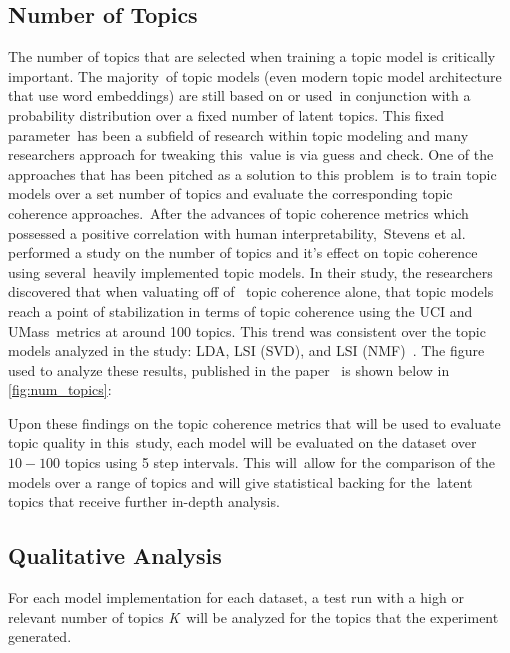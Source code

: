 \documentclass[letterpaper,12pt]{article}
\begin{document}
\subsection{Number of Topics}
The number of topics that are selected when training a topic model is critically important. The majority\
of topic models (even modern topic model architecture that use word embeddings) are still based on or used\
in conjunction with a probability distribution over a fixed number of latent topics. This fixed parameter\
has been a subfield of research within topic modeling and many researchers approach for tweaking this\
value is via guess and check. One of the approaches that has been pitched as a solution to this problem\
is to train topic models over a set number of topics and evaluate the corresponding topic coherence approaches.\
After the advances of topic coherence metrics which possessed a positive correlation with human interpretability,\
Stevens et al. performed a study on the number of topics and it's effect on topic coherence using several\
heavily implemented topic models. In their study, the researchers discovered that when valuating off of \
topic coherence alone, that topic models reach a point of stabilization in terms of topic coherence using the UCI and UMass\
metrics at around 100 topics. This trend was consistent over the topic models analyzed in the study: LDA, LSI (SVD), and LSI (NMF)\
\cite{stevens2012exploring}. The figure used to analyze these results, published in the paper \
is shown below in \ref{fig:num_topics}:


Upon these findings on the topic coherence metrics that will be used to evaluate topic quality in this\
study, each model will be evaluated on the dataset over $10-100$ topics using 5 step intervals. This will\
allow for the comparison of the models over a range of topics and will give statistical backing for the\
latent topics that receive further in-depth analysis.

\subsection{Qualitative Analysis}
For each model implementation for each dataset, a test run with a high or relevant number of topics \emph{K}\
will be analyzed for the topics that the experiment generated.
\end{document}
